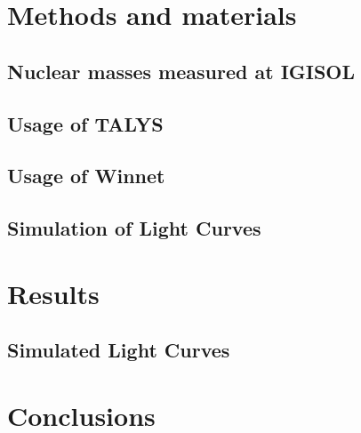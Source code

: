 \documentclass[final]{thesis} %
\begin{document}
\section{Methods and materials}
\label{sec:methods-and-materials}

\subsection{Nuclear masses measured at IGISOL}
\label{sec:igisol}

\subsection{Usage of TALYS}
\label{sec:talysmethod}

\subsection{Usage of Winnet}
\label{sec:winnetmethod}

\subsection{Simulation of Light Curves}
\label{sec:solc}


\section{Results}
\label{sec:results}

\subsection{Simulated Light Curves}
\label{sec:slc}


\section{Conclusions}
\label{sec:conclusions}


\nocite{*}

\printbibliography
\end{document}
